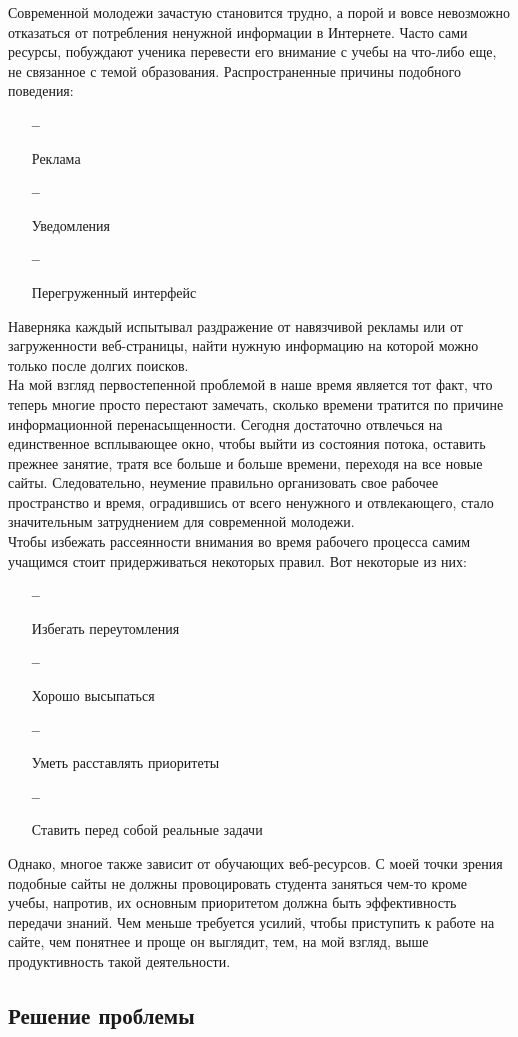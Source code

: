 \documentclass[a4paper, 12pt]{extarticle}
\begin{document}
Современной молодежи зачастую становится трудно, а порой и вовсе невозможно
отказаться от потребления ненужной информации в Интернете. Часто сами ресурсы,
побуждают ученика перевести его внимание с учебы на что-либо еще, не связанное
с темой образования. Распространенные причины подобного поведения:
\begin{itemize}
    \item[\bfseries--] {\small Реклама\par}
    \item[\bfseries--] {\small Уведомления\par}
    \item[\bfseries--] {\small Перегруженный интерфейс\par}
\end{itemize}
Наверняка каждый испытывал раздражение от навязчивой рекламы или от
загруженности веб-страницы, найти нужную информацию на которой можно только
после долгих поисков.
\\

На мой взгляд первостепенной проблемой в наше время является тот факт, что
теперь многие просто перестают замечать, сколько времени тратится по причине
информационной перенасыщенности. Сегодня достаточно отвлечься на единственное
всплывающее окно, чтобы выйти из состояния потока, оставить прежнее занятие,
тратя все больше и больше времени, переходя на все новые сайты. Следовательно,
неумение правильно организовать свое рабочее пространство и время, оградившись от всего
ненужного и отвлекающего, стало значительным затруднением для современной
молодежи.
\\

Чтобы избежать рассеянности внимания во время рабочего процесса самим учащимся
стоит придерживаться некоторых правил. Вот некоторые из них:
\begin{itemize}
    \item[\bfseries--] {\small Избегать переутомления\par}
    \item[\bfseries--] {\small Хорошо высыпаться\par}
    \item[\bfseries--] {\small Уметь расставлять приоритеты\par}
    \item[\bfseries--] {\small Ставить перед собой реальные задачи\par}
\end{itemize}
Однако, многое также зависит от обучающих веб-ресурсов. С моей точки зрения
подобные сайты не должны провоцировать студента заняться чем-то кроме учебы,
напротив, их основным приоритетом должна быть эффективность передачи знаний.
Чем меньше требуется усилий, чтобы приступить к работе на сайте, чем понятнее и
проще он выглядит, тем, на мой взгляд, выше продуктивность такой деятельности.
\newpage

\subsection{Решение проблемы}

\newpage
\end{document}
